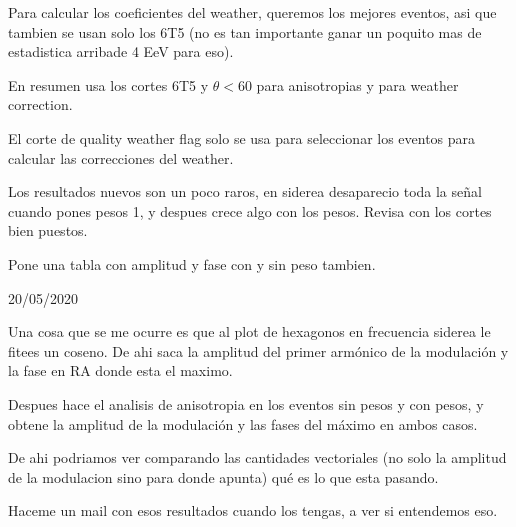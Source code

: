 \begin{itemize}
\done Para calcular los coeficientes del weather, queremos los mejores eventos, asi que tambien se usan solo los 6T5 (no es tan importante ganar un poquito mas de estadistica arribade 4 EeV para eso).

\done En resumen usa los cortes 6T5 y $\theta<60$ para anisotropias y para weather correction.

\done El corte de quality weather flag solo se usa para seleccionar los eventos para calcular las correcciones del weather.

\done Los resultados nuevos son un poco raros, en siderea desaparecio toda la señal cuando pones pesos 1, y despues crece algo con los pesos. Revisa con los cortes bien puestos.

\done Pone una tabla con amplitud y fase con y sin peso tambien.

\end{itemize}


20/05/2020

\begin{itemize}


\done Una cosa que se me ocurre es que al plot de hexagonos en frecuencia siderea le fitees un coseno. De ahi saca la amplitud del primer armónico de la modulación y la fase en RA donde esta el maximo.

\done Despues hace el analisis de anisotropia en los eventos sin pesos y con pesos, y obtene la amplitud de la modulación y las fases del máximo en ambos casos.

\done De ahi podriamos ver comparando las cantidades vectoriales (no solo la amplitud de la modulacion sino para donde apunta) qué es lo que esta pasando.

\done Haceme un mail con esos resultados cuando los tengas, a ver si entendemos eso.

\end{itemize}
